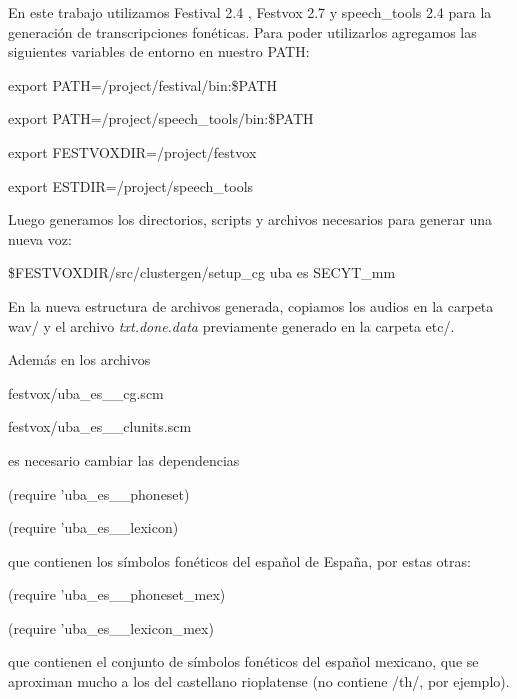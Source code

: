 En este trabajo utilizamos Festival 2.4 \cite{festivalDownload}, Festvox 2.7 \cite{festvoxDownload} y speech\_tools 2.4 \cite{speechToolDownload} para la generación de transcripciones fonéticas. Para poder utilizarlos agregamos las siguientes variables de entorno en nuestro PATH:

\begin{tcolorbox}
export PATH=/project/festival/bin:\$PATH

export PATH=/project/speech\_tools/bin:\$PATH

export FESTVOXDIR=/project/festvox

export ESTDIR=/project/speech\_tools
\end{tcolorbox}

Luego generamos los directorios, scripts y archivos necesarios para generar una nueva voz:
\begin{tcolorbox}
\$FESTVOXDIR/src/clustergen/setup\_cg uba es SECYT\_mm
\end{tcolorbox}

En la nueva estructura de archivos generada, copiamos los audios en la carpeta wav/ y el archivo \textit{txt.done.data} previamente generado en la carpeta etc/.

Además en los archivos 

\begin{tcolorbox}
festvox/uba\_es\_\_cg.scm 

festvox/uba\_es\_\_clunits.scm
\end{tcolorbox}

\noindent es necesario cambiar las dependencias 

\begin{tcolorbox}
(require 'uba\_es\_\_phoneset)

(require 'uba\_es\_\_lexicon)
\end{tcolorbox}

\noindent que contienen los símbolos fonéticos del español de España, por estas otras:

\begin{tcolorbox}
(require 'uba\_es\_\_phoneset\_mex)

(require 'uba\_es\_\_lexicon\_mex)
\end{tcolorbox}

\noindent que contienen el conjunto de símbolos fonéticos del español mexicano, que se aproximan mucho a los del castellano rioplatense (no contiene /th/, por ejemplo).

